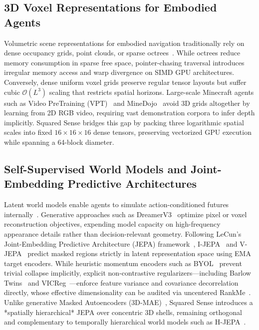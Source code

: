 \documentclass[runningheads]{llncs}
\begin{document}
\subsection{3D Voxel Representations for Embodied Agents}
Volumetric scene representations for embodied navigation traditionally rely on dense occupancy grids, point clouds, or sparse octrees~\cite{ha2018worldmodels,wang2023voyager}. While octrees reduce memory consumption in sparse free space, pointer-chasing traversal introduces irregular memory access and warp divergence on SIMD GPU architectures. Conversely, dense uniform voxel grids preserve regular tensor layouts but suffer cubic $\mathcal{O}(L^3)$ scaling that restricts spatial horizons. Large-scale Minecraft agents such as Video PreTraining (VPT)~\cite{baker2022vpt} and MineDojo~\cite{fan2022minedojo} avoid 3D grids altogether by learning from 2D RGB video, requiring vast demonstration corpora to infer depth implicitly. Squared Sense bridges this gap by packing three logarithmic spatial scales into fixed $16\times16\times16$ dense tensors, preserving vectorized GPU execution while spanning a 64-block diameter.

\subsection{Self-Supervised World Models and Joint-Embedding Predictive Architectures}
Latent world models enable agents to simulate action-conditioned futures internally~\cite{ha2018worldmodels,hafner2023dreamerv3}. Generative approaches such as DreamerV3~\cite{hafner2023dreamerv3} optimize pixel or voxel reconstruction objectives, expending model capacity on high-frequency appearance details rather than decision-relevant geometry. Following LeCun's Joint-Embedding Predictive Architecture (JEPA) framework~\cite{lecun2022path}, I-JEPA~\cite{assran2023ijepa} and V-JEPA~\cite{bardes2024vjepa} predict masked regions strictly in latent representation space using EMA target encoders. While heuristic momentum encoders such as BYOL~\cite{grill2020byol} prevent trivial collapse implicitly, explicit non-contrastive regularizers—including Barlow Twins~\cite{zbontar2021barlow} and VICReg~\cite{bardes2022vicreg}—enforce feature variance and covariance decorrelation directly, whose effective dimensionality can be audited via uncentered RankMe~\cite{garrido2023rankme}. Unlike generative Masked Autoencoders (3D-MAE)~\cite{he2022mae}, Squared Sense introduces a *spatially hierarchical* JEPA over concentric 3D shells, remaining orthogonal and complementary to temporally hierarchical world models such as H-JEPA~\cite{lecun2022path}.
\end{document}
